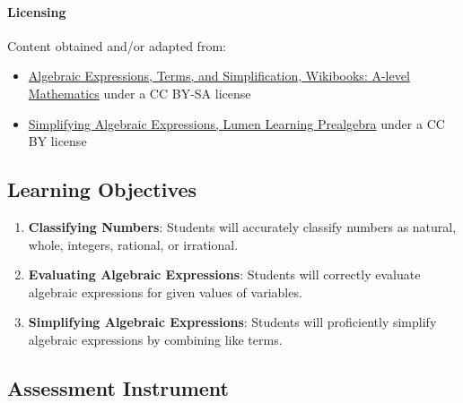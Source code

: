 \paragraph{Licensing}



Content obtained and/or adapted from:



\begin{itemize}
    \item \href{https://en.wikibooks.org/wiki/A-level_Mathematics/Edexcel/Core_1/Algebra/Expressions,_Terms_and_Simplifying_Equations}{Algebraic Expressions, Terms, and Simplification, Wikibooks: A-level Mathematics} under a CC BY-SA license
    \item \href{https://en.wikibooks.org/wiki/A-level_Mathematics/Edexcel/Core_1/Algebra/Expressions,_Terms_and_Simplifying_Equations}{Simplifying Algebraic Expressions, Lumen Learning Prealgebra} under a CC BY license
\end{itemize}

\subsection{Learning Objectives}

\begin{enumerate}
    \item \textbf{Classifying Numbers}: Students will accurately classify numbers as natural, whole, integers, rational, or irrational.
    \item \textbf{Evaluating Algebraic Expressions}: Students will correctly evaluate algebraic expressions for given values of variables.
    \item \textbf{Simplifying Algebraic Expressions}: Students will proficiently simplify algebraic expressions by combining like terms.
\end{enumerate}

\subsection{Assessment Instrument}

